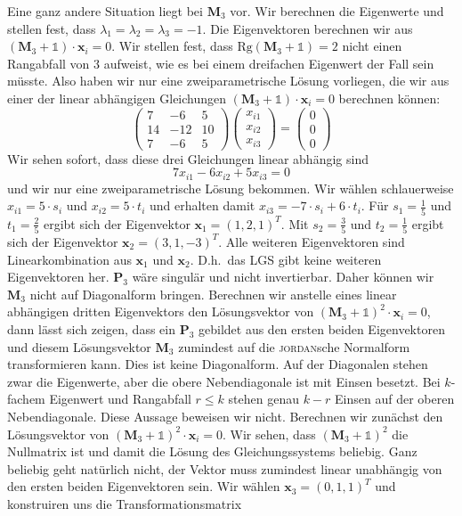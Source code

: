 Eine ganz andere Situation liegt bei $\mathbf{M}_3$ vor. Wir berechnen die Eigenwerte und stellen fest, dass $\lambda_1=\lambda_2=\lambda_3=-1$.
Die Eigenvektoren berechnen wir aus  $(\mathbf{M}_3+\mathds{1})\cdot\mathbf{x}_i=0$. Wir stellen fest, dass $\text{Rg}(\mathbf{M}_3+\mathds{1})=2$ nicht einen Rangabfall von 3 aufweist, wie es bei einem dreifachen Eigenwert der Fall sein müsste. Also haben wir nur eine zweiparametrische Lösung vorliegen, die wir aus einer der linear abhängigen Gleichungen $(\mathbf{M}_3+\mathds{1})\cdot\mathbf{x}_i=0$ berechnen können:
\[
\begin{pmatrix}7&-6&5\\ 14&-12&10\\ 7&-6&5\end{pmatrix}
\begin{pmatrix}x_{i1}\\ x_{i2}\\ x_{i3}\end{pmatrix}=
\begin{pmatrix}0\\ 0\\ 0\end{pmatrix}
\]
Wir sehen sofort, dass diese drei Gleichungen linear abhängig sind 
\[ 7x_{i1}-6x_{i2}+5x_{i3}=0\]
und wir nur eine zweiparametrische Lösung bekommen. Wir wählen schlauerweise $x_{i1}=5\cdot s_i$ und $x_{i2}=5\cdot t_i$ und erhalten damit $x_{i3}=-7\cdot s_i+6\cdot t_i$. Für $s_1=\frac{1}{5}$ und $t_1=\frac{2}{5}$ ergibt sich der Eigenvektor $\mathbf{x}_1=(1,2,1)^T$. Mit $s_2=\frac{3}{5}$ und $t_2=\frac{1}{5}$ ergibt sich der Eigenvektor $\mathbf{x}_2=(3,1,-3)^T$. Alle weiteren Eigenvektoren sind Linearkombination aus $\mathbf{x}_1$ und $\mathbf{x}_2$. D.h.\  das LGS gibt keine weiteren Eigenvektoren her. $\mathbf{P}_3$ wäre singulär und nicht invertierbar. Daher können wir $\mathbf{M}_3$ nicht auf Diagonalform bringen. Berechnen wir anstelle eines linear abhängigen dritten Eigenvektors den Lösungsvektor von $(\mathbf{M}_3+\mathds{1})^2\cdot\mathbf{x}_i=0$, dann lässt sich zeigen, dass ein $\mathbf{P}_3$ gebildet aus den ersten beiden Eigenvektoren und diesem Lösungsvektor $\mathbf{M}_3$ zumindest auf die \textsc{jordan}sche Normalform transformieren kann. Dies ist keine Diagonalform. Auf der Diagonalen stehen zwar die Eigenwerte, aber die obere Nebendiagonale ist mit Einsen besetzt. Bei $k$-fachem Eigenwert und Rangabfall $r\le k$ stehen genau $k-r$ Einsen auf der oberen Nebendiagonale. Diese Aussage beweisen wir nicht. Berechnen wir zunächst den Lösungsvektor von $(\mathbf{M}_3+\mathds{1})^2\cdot\mathbf{x}_i=0$. Wir sehen, dass $(\mathbf{M}_3+\mathds{1})^2$ die Nullmatrix ist und damit die Lösung des Gleichungssystems beliebig. Ganz beliebig geht natürlich nicht, der Vektor muss zumindest linear unabhängig von den ersten beiden Eigenvektoren sein. Wir wählen $\mathbf{x}_3=(0,1,1)^T$ und konstruiren uns die Transformationsmatrix
